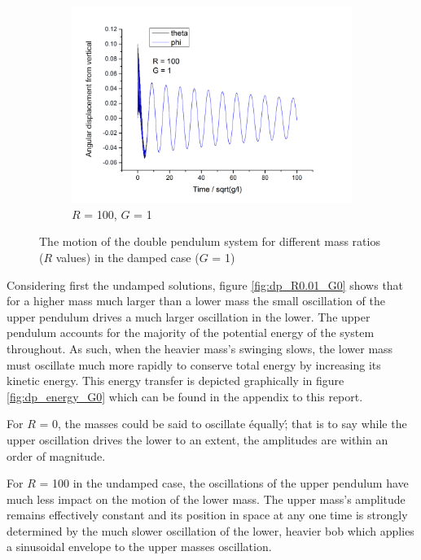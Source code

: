 \documentclass[11pt]{article}
\begin{document}
\begin{figure}[h!]
\begin{subfigure}[h]{0.5\textwidth}
    \includegraphics[width=\textwidth]{img/dp/R=100_G=1.png}
    \captionsetup{width=0.85\textwidth}
    \caption{$R$ = 100, $G$ = 1}
    \label{fig:dp_R1_G1}
  \end{subfigure}
  \caption{The motion of the double pendulum system for different mass ratios ($R$ values) in the damped case ($G$ = 1)}
\end{figure}

Considering first the undamped solutions, figure \ref{fig:dp_R0.01_G0} shows that for a higher mass much larger than a lower mass the small oscillation of the upper pendulum drives a much larger oscillation in the lower. The upper pendulum accounts for the majority of the potential energy of the system throughout. As such, when the heavier mass's swinging slows, the lower mass must oscillate much more rapidly to conserve total energy by increasing its kinetic energy.
This energy transfer is depicted graphically in figure \ref{fig:dp_energy_G0} which can be found in the appendix to this report.

For $R$ = 0, the masses could be said to oscillate \'equally\'; that is to say while the upper oscillation drives the lower to an extent, the amplitudes are within an order of magnitude.

For $R$ = 100 in the undamped case, the oscillations of the upper pendulum have much less impact on the motion of the lower mass. The upper mass's amplitude remains effectively constant and its position in space at any one time is strongly determined by the much slower oscillation of the lower, heavier bob which applies a sinusoidal envelope to the upper masses oscillation.
\end{document}
